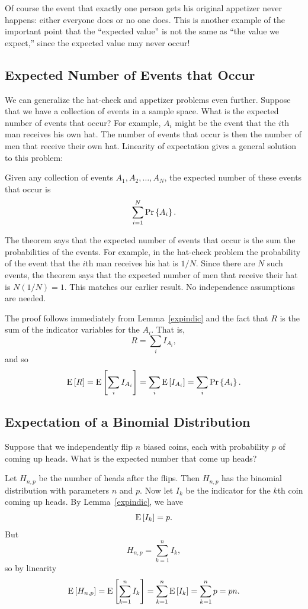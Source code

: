 \documentclass[11pt,twoside]{article}
\begin{document}
Of course the event that exactly one person gets his original appetizer
never happens: either everyone does or no one does.  This is another
example of the important point that the ``expected value'' is not the same
as ``the value we expect,'' since the expected value may never occur!

\subsection{Expected Number of Events that Occur}

We can generalize the hat-check and appetizer problems even further.
Suppose that we have a collection of events in a sample space.  What is
the expected number of events that occur?  For example, $A_i$ might be the
event that the $i$th man receives his own hat.  The number of events that
occur is then the number of men that receive their own hat.  Linearity of
expectation gives a general solution to this problem:

\begin{theorem}
Given any collection of events $A_1, A_2, \dots, A_N$, the expected number
of these events that occur is
\[
\sum_{i=1}^N \mathop{\textup{Pr}}\nolimits\left\{A_i\right\}.
\]
\end{theorem}

The theorem says that the expected number of events that occur is the
sum the probabilities of the events.  For example, in the hat-check
problem the probability of the event that the $i$th man receives his
hat is $1/N$.  Since there are $N$ such events, the theorem
says that the expected number of men that receive their hat is $N
(1/N) = 1$.  This matches our earlier result.
No independence assumptions are needed.

The proof follows immediately from Lemma~\ref{expindic} and the fact that
$R$ is the sum of the indicator variables for the $A_i$.
That is,
\[
R = \sum_i I_{A_i},
\]
and
so
\[
\mathop{\textup{E}}\nolimits\left[R\right] = \mathop{\textup{E}}\nolimits\left[\sum_i I_{A_i}\right] = \sum_i \mathop{\textup{E}}\nolimits\left[I_{A_i}\right] = \sum_i \mathop{\textup{Pr}}\nolimits\left\{A_i\right\}.
\]

\subsection{Expectation of a Binomial Distribution}

Suppose that we independently flip $n$ biased coins, each with probability
$p$ of coming up heads.  What is the expected number that come up heads?

Let $H_{n,p}$ be the number of heads after the flips.  Then $H_{n,p}$ has
the binomial distribution with parameters $n$ and $p$.  Now let $I_k$ be
the indicator for the $k$th coin coming up heads.  By
Lemma~\ref{expindic}, we have
\[
\mathop{\textup{E}}\nolimits\left[I_k\right] = p.
\]
But
\[
H_{n,p} = \sum_{k=1}^n I_k,
\]
so by linearity
\[
\mathop{\textup{E}}\nolimits\left[H_{n,p}\right] = \mathop{\textup{E}}\nolimits\left[\sum_{k=1}^n I_k\right] = \sum_{k=1}^n \mathop{\textup{E}}\nolimits\left[I_k\right] =
\sum_{k=1}^n p = pn.
\]
\end{document}
